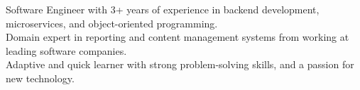 \begin{rSection}{}
    \begin{center}
        Software Engineer with 3+ years of experience in backend development, microservices, and object-oriented programming. \\
        Domain expert in reporting and content management systems from working at leading software companies. \\
        Adaptive and quick learner with strong problem-solving skills, and a passion for new technology. \\
    \end{center}
\end{rSection}